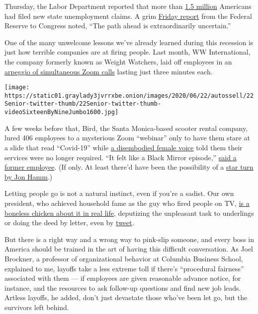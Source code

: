 Thursday, the Labor Department reported that more than
\href{https://www.nytimes3xbfgragh.onion/2020/06/11/business/economy/unemployment-claims-coronavirus.html?campaign_id=9\&emc=edit_nn_20200612\&instance_id=19339\&nl=the-morning\&regi_id=78243797\&segment_id=30751\&te=1\&user_id=271fccc23f80ce773b97febcc97e1904}{1.5
million} Americans had filed new state unemployment claims. A grim
\href{https://www.nytimes3xbfgragh.onion/2020/06/12/business/economy/federal-reserve-economy-coronavirus.html}{Friday
report} from the Federal Reserve to Congress noted, ``The path ahead is
extraordinarily uncertain.''

One of the many unwelcome lessons we've already learned during this
recession is just how terrible companies are at firing people. Last
month, WW International, the company formerly known as Weight Watchers,
laid off employees in an
\href{https://www.nytimes3xbfgragh.onion/2020/05/22/business/weight-watchers-firings-zoom.html}{arpeggio
of simultaneous Zoom calls} lasting just three minutes each.

\texttt{[image: https://static01.graylady3jvrrxbe.onion/images/2020/06/22/autossell/22Senior-twitter-thumb/22Senior-twitter-thumb-videoSixteenByNineJumbo1600.jpg]}

A few weeks before that, Bird, the Santa Monica-based scooter rental
company, lured 406 employees to a mysterious Zoom ``webinar'' only to
have them stare at a slide that read ``Covid-19'' while
\href{https://dot.la/bird-layoffs-meeting-story-2645612465.html}{a
disembodied female voice} told them their services were no longer
required. ``It felt like a Black Mirror episode,''
\href{https://dot.la/bird-layoffs-meeting-story-2645612465.html}{said a
former employee}. (If only. At least there'd have been the possibility
of a
\href{https://www.nytimes3xbfgragh.onion/2014/12/22/arts/television/jon-hamm-stars-in-black-mirror-christmas-special.html}{star
turn by Jon Hamm}.)

Letting people go is not a natural instinct, even if you're a sadist.
Our own president, who achieved household fame as the guy who fired
people on TV,
\href{https://www.washingtonpost.com/outlook/2018/09/25/president-trump-is-afraid-fire-people/}{is
a boneless chicken about it in real life}, deputizing the unpleasant
task to underlings or doing the deed by letter, even by
\href{https://foreignpolicy.com/2019/09/10/bolton-trump-fires-national-security-advisor-via-twitter/}{tweet}.

But there is a right way and a wrong way to pink-slip someone, and every
boss in America should be trained in the art of having this difficult
conversation. As Joel Brockner, a professor of organizational behavior
at Columbia Business School, explained to me, layoffs take a less
extreme toll if there's ``procedural fairness'' associated with them ---
if employees are given reasonable advance notice, for instance, and the
resources to ask follow-up questions and find new job leads. Artless
layoffs, he added, don't just devastate those who've been let go, but
the survivors left behind.

